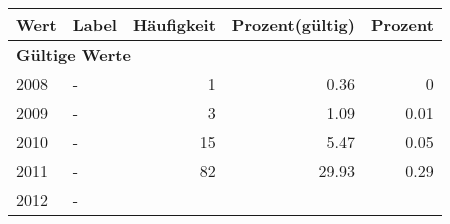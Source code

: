      \begin{longtable}{lXrrr}
     \toprule
     \textbf{Wert} & \textbf{Label} & \textbf{Häufigkeit} & \textbf{Prozent(gültig)} & \textbf{Prozent} \\
     \endhead
     \midrule
     \multicolumn{5}{l}{\textbf{Gültige Werte}}\\

     2008 &
     \multicolumn{1}{X}{ -  } &


       \num{1} &
       \num[round-mode=places,round-precision=2]{0,36} &
         \num[round-mode=places,round-precision=2]{0} \\

     2009 &
     \multicolumn{1}{X}{ -  } &


       \num{3} &
       \num[round-mode=places,round-precision=2]{1,09} &
         \num[round-mode=places,round-precision=2]{0,01} \\

     2010 &
     \multicolumn{1}{X}{ -  } &


       \num{15} &
       \num[round-mode=places,round-precision=2]{5,47} &
         \num[round-mode=places,round-precision=2]{0,05} \\

     2011 &
     \multicolumn{1}{X}{ -  } &


       \num{82} &
       \num[round-mode=places,round-precision=2]{29,93} &
         \num[round-mode=places,round-precision=2]{0,29} \\

     2012 &
     \multicolumn{1}{X}{ -  } &



\end{longtable}
